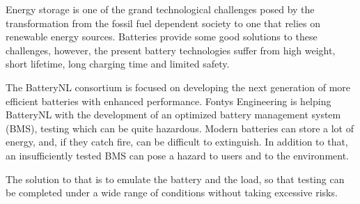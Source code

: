 
Energy storage is one of the grand technological challenges posed by the transformation from the fossil fuel dependent society to one that relies on renewable energy sources. Batteries provide some good solutions to these challenges, however, the present battery technologies suffer from high weight, short lifetime, long charging time and limited safety.

The BatteryNL consortium is focused on developing the next generation of more efficient batteries with enhanced performance. Fontys Engineering is helping BatteryNL with the development of an optimized battery management system (BMS), testing which can be quite hazardous. Modern batteries can store a lot of energy, and, if they catch fire, can be difficult to extinguish. In addition to that, an insufficiently tested BMS can pose a hazard to users and to the environment. 

The solution to that is to emulate the battery and the load, so that testing can be completed under a wide range of conditions without taking excessive risks. 

